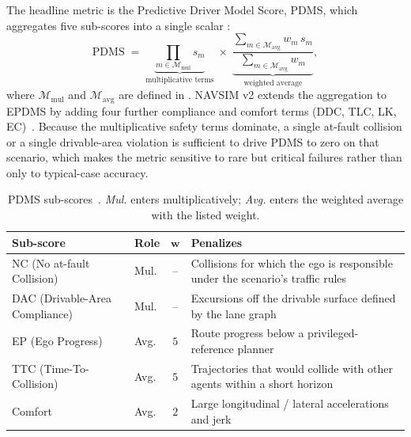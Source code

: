 The headline metric is the Predictive Driver Model Score, PDMS, which aggregates five sub-scores into a single scalar \cite{dauner-pdm-2023,dauner-navsim-2024}:
\begin{equation}
\label{eq:pdms}
\mathrm{PDMS} \;=\; \underbrace{\prod_{m \in \mathcal{M}_{\mathrm{mul}}} s_m}_{\text{multiplicative terms}} \;\times\; \underbrace{\frac{\sum_{m \in \mathcal{M}_{\mathrm{avg}}} w_m \, s_m}{\sum_{m \in \mathcal{M}_{\mathrm{avg}}} w_m}}_{\text{weighted average}},
\end{equation}
where $\mathcal{M}_\text{mul}$ and $\mathcal{M}_\text{avg}$ are defined in . NAVSIM v2 extends the aggregation to EPDMS by adding four further compliance and comfort terms (DDC, TLC, LK, EC)~\cite{navsim-v2-2024}. Because the multiplicative safety terms dominate, a single at-fault collision or a single drivable-area violation is sufficient to drive PDMS to zero on that scenario, which makes the metric sensitive to rare but critical failures rather than only to typical-case accuracy.

\begin{table}[ht]
\centering
\caption{PDMS sub-scores~\cite{dauner-pdm-2023,dauner-navsim-2024}. \emph{Mul.} enters multiplicatively; \emph{Avg.} enters the weighted average with the listed weight.}
\label{tab:bg-pdms-subscores}
\small
\setlength{\tabcolsep}{6pt}
\renewcommand{\arraystretch}{1.15}
\begin{tabular}{@{}l l c >{\raggedright\arraybackslash}p{7.5cm}@{}}
\toprule
\textbf{Sub-score} & \textbf{Role} & $\boldsymbol{w}$ & \textbf{Penalizes} \\
\midrule
NC (No at-fault Collision)    & Mul. & --      & Collisions for which the ego is responsible under the scenario's traffic rules \\
DAC (Drivable-Area Compliance) & Mul. & --      & Excursions off the drivable surface defined by the lane graph \\
EP (Ego Progress)             & Avg. & $5$     & Route progress below a privileged-reference planner \\
TTC (Time-To-Collision)       & Avg. & $5$     & Trajectories that would collide with other agents within a short horizon \\
Comfort                       & Avg. & $2$     & Large longitudinal / lateral accelerations and jerk \\
\bottomrule
\end{tabular}
\end{table}

